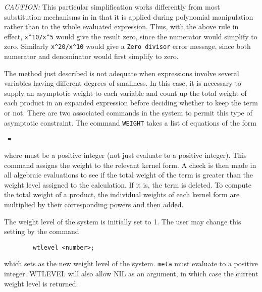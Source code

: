 \textit{CAUTION:}  This particular simplification works differently from most
substitution mechanisms in {\REDUCE} in that it is applied during
polynomial manipulation rather than to the whole evaluated expression.
Thus, with the above rule in effect, 
\texttt{x\textasciicircum 10/x\textasciicircum 5} would give the
result zero, since the numerator would simplify to zero.  Similarly
\texttt{x\textasciicircum 20/x\textasciicircum 10} would give a 
\texttt{Zero divisor} error message,
since both numerator and denominator would first simplify to zero.

\hypertarget{command:WEIGHT}{}
The method just described is not adequate when expressions involve several
variables having different degrees of smallness. In this case, it is
necessary to supply an asymptotic weight to each variable and count up the
total weight of each product in an expanded expression before deciding
whether to keep the term or not. There are two associated commands in the
system to permit this type of asymptotic constraint. The command 
\texttt{WEIGHT}
takes a list of equations of the form
\begin{syntax}
       \texttt{ = } 
\end{syntax}
where  must be a positive integer (not just evaluate to a
positive integer).  This command assigns the weight  to the
relevant kernel form.  A check is then made in all algebraic evaluations
to see if the total weight of the term is greater than the weight level
assigned to the calculation.  If it is, the term is deleted.  To compute
the total weight of a product, the individual weights of each kernel form
are multiplied by their corresponding powers and then added.

\hypertarget{command:WTLEVEL}{}
The weight level of the system is initially set to 1. The user may change
this setting by the command
\begin{verbatim}
        wtlevel <number>;
\end{verbatim}
which sets  as the new weight level of the system.
\texttt{meta} must evaluate to a positive integer.  WTLEVEL will also
allow NIL as an argument, in which case the current weight level is returned.

